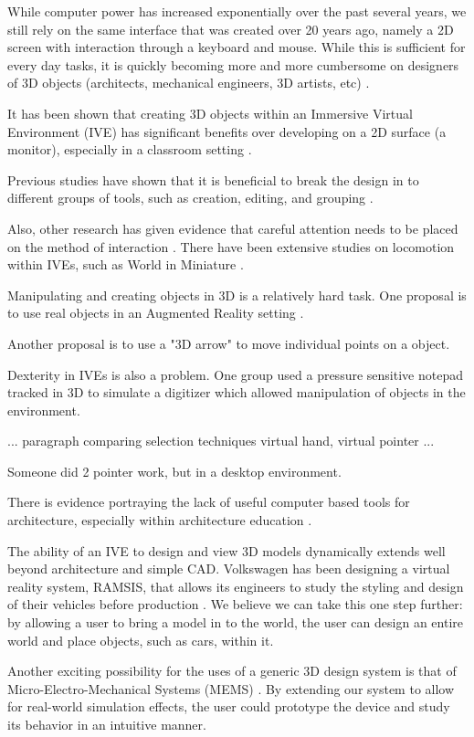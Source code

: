 While computer power has increased exponentially over the past several years, we still rely on the same interface that was created over 20 years ago, namely a 2D screen with interaction through a keyboard and mouse.
While this is sufficient for every day tasks, it is quickly becoming more and more cumbersome on designers of 3D objects (architects, mechanical engineers, 3D artists, etc) \cite{Dekker199242}.

It has been shown that creating 3D objects within an Immersive Virtual Environment (IVE) has significant benefits over developing on a 2D surface (a monitor)\cite{Kaufmann:Usability}, especially in a classroom setting \cite{Kaufmann:LearningGeometry}.

Previous studies have shown that it is beneficial to break the design in to different groups of tools, such as creation, editing, and grouping
\cite{Butterworth:1992:3DM}.

Also, other research has given evidence that careful attention needs to be placed on the method of interaction \cite{Bowman98interactiontechniques}.
There have been extensive studies on locomotion within IVEs, such as World in Miniature \cite{Pausch:WorldInMiniature}.

Manipulating and creating objects in 3D is a relatively hard task\cite{Mine:MovingObjects}.
One proposal is to use real objects in an Augmented Reality setting
\cite{Jota:2011:CVM:1979742.1979915}.

Another proposal is to use a "3D arrow" to move individual points on a object\cite{5759472}.

Dexterity in IVEs is also a problem.
One group used a pressure sensitive notepad tracked in 3D to simulate a digitizer which allowed manipulation of
objects in the environment\cite{658467}.

... paragraph comparing selection techniques  virtual hand, virtual pointer \cite{5307641}...

Someone did 2 pointer work, but in a desktop environment\cite{Zeleznik:1997:TPI:253284.253316}.

There is evidence portraying the lack of useful computer based tools for architecture, especially within architecture education \cite{Dobson:Architecture}.

The ability of an IVE to design and view 3D models dynamically extends well beyond architecture and simple CAD.
Volkswagen has been designing a virtual reality system, RAMSIS, that allows its engineers to study the styling and design of their vehicles before production \cite{Purschke:Cars}.
We believe we can take this one step further: by allowing a user to bring a model in to the world, the user can design an entire world and place objects, such as cars, within it.

Another exciting possibility for the uses of a generic 3D design system is that of Micro-Electro-Mechanical Systems (MEMS) \cite{Zhao:MEMS}.
By extending our system to allow for real-world simulation effects, the user could prototype the device and study its behavior in an intuitive manner.
